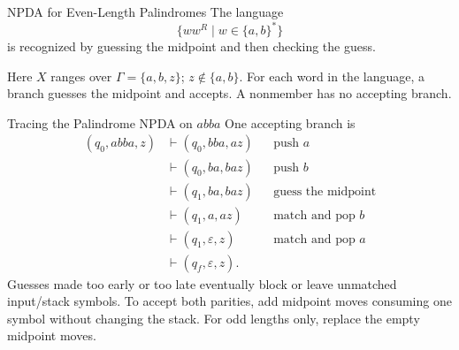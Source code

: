 \documentclass[10pt]{beamer}
\begin{document}
\begin{frame}{NPDA for Even-Length Palindromes}
  The language
  \[
    \{ww^R\mid w\in\{a,b\}^*\}
  \]
  \pause
  is recognized by guessing the midpoint and then checking the guess.
  \begin{center}
  \end{center}
  Here $X$ ranges over $\Gamma=\{a,b,z\}$; $z\notin\{a,b\}$.
  For each word in the language, a branch guesses the midpoint and accepts.
  A nonmember has no accepting branch.
\end{frame}

\begin{frame}{Tracing the Palindrome NPDA on $abba$}
  One accepting branch is
  \[
  \begin{aligned}
    (q_0,abba,z)
      &\vdash(q_0,bba,az) &&\text{push }a\\
      &\vdash(q_0,ba,baz) &&\text{push }b\\
      &\vdash(q_1,ba,baz) &&\text{guess the midpoint}\\
      &\vdash(q_1,a,az) &&\text{match and pop }b\\
      &\vdash(q_1,\varepsilon,z) &&\text{match and pop }a\\
      &\vdash(q_f,\varepsilon,z). &&
  \end{aligned}
  \]
  \pause
  Guesses made too early or too late eventually block or leave unmatched input/stack symbols.
  To accept both parities, add midpoint moves consuming one symbol without
  changing the stack. For odd lengths only, replace the empty midpoint moves.
\end{frame}
\end{document}
